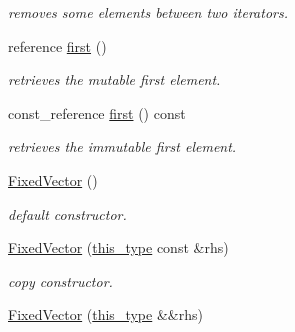 \begin{DoxyCompactItemize}
\begin{DoxyCompactList}\small\item\em removes some elements between two iterators. \end{DoxyCompactList}\item 
\hypertarget{classhryky_1_1_fixed_vector_a1133d189d2a155830e739d20450e1b40}{reference \hyperlink{classhryky_1_1_fixed_vector_a1133d189d2a155830e739d20450e1b40}{first} ()}\label{classhryky_1_1_fixed_vector_a1133d189d2a155830e739d20450e1b40}

\begin{DoxyCompactList}\small\item\em retrieves the mutable first element. \end{DoxyCompactList}\item 
\hypertarget{classhryky_1_1_fixed_vector_a5b781416618b956fddd0f08b614b2c79}{const\-\_\-reference \hyperlink{classhryky_1_1_fixed_vector_a5b781416618b956fddd0f08b614b2c79}{first} () const }\label{classhryky_1_1_fixed_vector_a5b781416618b956fddd0f08b614b2c79}

\begin{DoxyCompactList}\small\item\em retrieves the immutable first element. \end{DoxyCompactList}\item 
\hypertarget{classhryky_1_1_fixed_vector_a5d232c24602527464caa5aa8f6a83554}{\hyperlink{classhryky_1_1_fixed_vector_a5d232c24602527464caa5aa8f6a83554}{Fixed\-Vector} ()}\label{classhryky_1_1_fixed_vector_a5d232c24602527464caa5aa8f6a83554}

\begin{DoxyCompactList}\small\item\em default constructor. \end{DoxyCompactList}\item 
\hypertarget{classhryky_1_1_fixed_vector_a007d4a0f2cf805378371dfec216e4cf1}{\hyperlink{classhryky_1_1_fixed_vector_a007d4a0f2cf805378371dfec216e4cf1}{Fixed\-Vector} (\hyperlink{classhryky_1_1_fixed_vector}{this\-\_\-type} const \&rhs)}\label{classhryky_1_1_fixed_vector_a007d4a0f2cf805378371dfec216e4cf1}

\begin{DoxyCompactList}\small\item\em copy constructor. \end{DoxyCompactList}\item 
\hypertarget{classhryky_1_1_fixed_vector_a73fd9e2ea6b89b386f10e745625fbef9}{\hyperlink{classhryky_1_1_fixed_vector_a73fd9e2ea6b89b386f10e745625fbef9}{Fixed\-Vector} (\hyperlink{classhryky_1_1_fixed_vector}{this\-\_\-type} \&\&rhs)}\label{classhryky_1_1_fixed_vector_a73fd9e2ea6b89b386f10e745625fbef9}


\end{DoxyCompactItemize}
